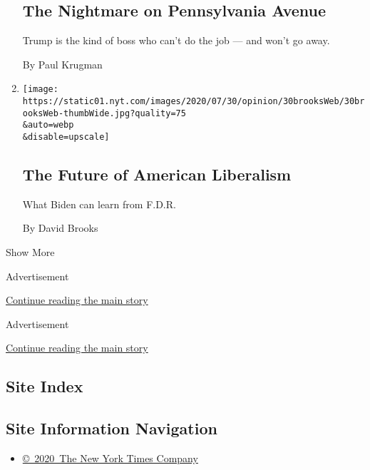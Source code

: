 \begin{enumerate}
  \hypertarget{the-nightmare-on-pennsylvania-avenue}{%
  \subsection{The Nightmare on Pennsylvania
  Avenue}\label{the-nightmare-on-pennsylvania-avenue}}

  Trump is the kind of boss who can't do the job --- and won't go away.

  By Paul Krugman
\item
  \href{/2020/07/30/opinion/biden-fdr.html}{}

  \texttt{[image: https://static01.nyt.com/images/2020/07/30/opinion/30brooksWeb/30brooksWeb-thumbWide.jpg?quality=75\\\&auto=webp\\\&disable=upscale]}

  \hypertarget{the-future-of-american-liberalism}{%
  \subsection{The Future of American
  Liberalism}\label{the-future-of-american-liberalism}}

  What Biden can learn from F.D.R.

  By David Brooks
\end{enumerate}

Show More

Advertisement

\protect\hyperlink{after-mid2}{Continue reading the main story}

Advertisement

\protect\hyperlink{after-mktg}{Continue reading the main story}

\hypertarget{site-index}{%
\subsection{Site Index}\label{site-index}}

\hypertarget{site-information-navigation}{%
\subsection{Site Information
Navigation}\label{site-information-navigation}}

\begin{itemize}
\tightlist
\item
  \href{https://help.nytimes.com/hc/en-us/articles/115014792127-Copyright-notice}{©~2020~The
  New York Times Company}
\end{itemize}

